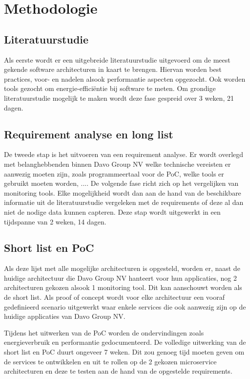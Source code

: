 \section{Methodologie}%
\label{sec:methodologie}
\subsection{Literatuurstudie}
Als eerste wordt er een uitgebreide literatuurstudie uitgevoerd om de meest gekende software architecturen in kaart te brengen. Hiervan worden best practices, voor- en nadelen alsook performantie aspecten opgezocht. Ook worden tools gezocht om energie-efficiëntie bij software te meten. Om grondige literatuurstudie mogelijk te maken wordt deze fase gespreid over 3 weken, 21 dagen.

\subsection{Requirement analyse en long list}
De tweede stap is het uitvoeren van een requirement analyse. Er wordt overlegd met belanghebbenden binnen Davo Group NV welke technische vereisten er aanwezig moeten zijn, zoals programmeertaal voor de PoC, welke tools er gebruikt moeten worden, .... De volgende fase richt zich op het vergelijken van monitoring tools. Elke mogelijkheid wordt dan aan de hand van de beschikbare informatie uit de literatuurstudie vergeleken met de requirements of deze al dan niet de nodige data kunnen capteren. Deze stap wordt uitgewerkt in een tijdspanne van 2 weken, 14 dagen.
\subsection{Short list en PoC}
Als deze lijst met alle mogelijke architecturen is opgesteld, worden er, naast de huidige architectuur die Davo Group NV hanteert voor hun applicaties, nog 2 architecturen gekozen alsook  1 monitoring tool. Dit kan aanschouwt worden als de short list. Als proof of concept wordt voor elke architectuur een vooraf gedefinieerd scenario uitgewerkt waar enkele services die ook aanwezig zijn op de huidige applicaties van Davo Group NV. 

Tijdens het uitwerken van de PoC worden de ondervindingen zoals energieverbruik en performantie gedocumenteerd. De volledige uitwerking van de short list en PoC duurt ongeveer 7 weken. Dit zou genoeg tijd moeten geven om de services te ontwikkelen en uit te rollen op de 2 gekozen microservice architecturen en deze te testen aan de hand van de opgestelde requirements.
